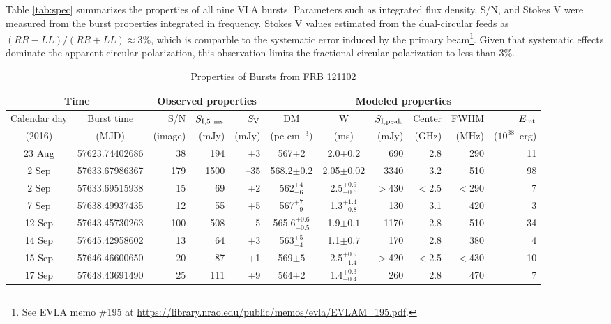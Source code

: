 \documentclass[twocolumn]{aastex61}
\newcommand{\frb}{FRB 121102}
\begin{document}
Table \ref{tab:spec} summarizes the properties of all nine VLA bursts. Parameters such as integrated flux density, S/N, and Stokes V were measured from the burst properties integrated in frequency. Stokes V values estimated from the dual-circular feeds as $(RR-LL)/(RR+LL)\approx3\%$, which is comparble to the systematic error induced by the primary beam\footnote{See EVLA memo \#195 at \url{https://library.nrao.edu/public/memos/evla/EVLAM_195.pdf}.}. Given that systematic effects dominate the apparent circular polarization, this observation limits the fractional circular polarization to less than 3\%.

\begin{table}
\caption{Properties of Bursts from \frb}
\centering
\begin{tabular}{cc|rrr|ccrrrr}
\multicolumn{2}{c|}{Time} & \multicolumn{3}{c|}{Observed properties} & \multicolumn{6}{c}{Modeled properties} \\ \hline
Calendar day & Burst time   & S/N & $S_{\rm{I, 5~ms}}$	& $S_{\rm{V}}$ 	& DM 			& W 			& $S_{\rm{I,peak}}$ & Center & FWHM & $E_{\rm{int}}$ \\
(2016)       &  (MJD)     &   (image)    & (mJy) 			& (mJy) 		    & (pc cm$^{-3})$ 	& (ms) 			& (mJy) 			& (GHz)  & (MHz) & ($10^{38}$\ erg)\\ \hline
23 Aug & 57623.74402686      & 38 		& 194			& +3				& 567$\pm2$ 		& 2.0$\pm0.2$	 		& 690 		& 2.8 		& 290 & 11 			\\
2 Sep & 57633.67986367      & 179 		& 1500			& --35 				& 568.2$\pm0.2$ 	& 2.05$\pm0.02$			& 3340 		& 3.2 		& 510 & 98				\\
2 Sep\tablenotemark{c} & 57633.69515938 & 15 & 69		& +2				& 562$^{+4}_{-6}$ 	& 2.5$^{+0.9}_{-0.6}$	& $>$430 	& $<$2.5	& $<$290 & 7  			\\
7 Sep & 57638.49937435      & 12 		& 55			& +5 				& 567$^{+7}_{-9}$ 	& 1.3$^{+1.4}_{-0.8}$	& 130 		& 3.1 		& 420 & 3  			\\
12 Sep\tablenotemark{a} & 57643.45730263  & 100 		& 508 & --5 		& 565.6$^{+0.6}_{-0.5}$ & 1.9$\pm0.1$		& 1170 		& 2.8 		& 510 & 34 			\\
14 Sep\tablenotemark{a} & 57645.42958602   & 13 		& 64 & +3			& 563$^{+5}_{-4}$ 	& 1.1$\pm0.7$		 	& 170 		& 2.8 		& 380 & 4  			\\
15 Sep\tablenotemark{c} & 57646.46600650 & 20 & 87		& +1				& 569$\pm5$ 		& 2.5$^{+0.9}_{-1.4}$	& $>$420 	& $<$2.5 	& $<$430 & 10 			\\	
17 Sep\tablenotemark{a,b} & 57648.43691490 & 25 & 111	& +9				& 564$\pm2$ 		& 1.4$^{+0.3}_{-0.4}$	& 260 		& 2.8 		& 470 & 7  			\\

\end{tabular}
\end{table}
\end{document}

